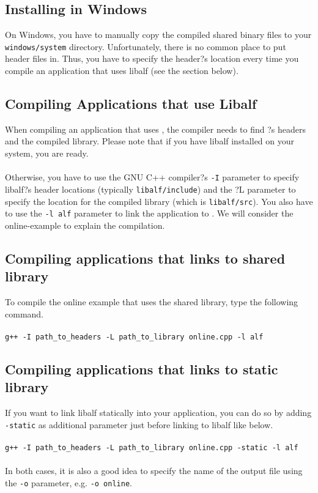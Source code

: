 \subsection*{Installing in Windows}
On Windows, you have to manually copy the compiled shared binary files to your \texttt{windows/system} directory. Unfortunately, there is no common place to put header files in. Thus, you have to specify the header?s location every time you compile an application that uses libalf (see the section below).

\subsection{Compiling Applications that use Libalf}
When compiling an application that uses \libalf, the compiler needs to find \libalf?s headers and the compiled library. Please note that if you have libalf installed on your system, you are ready. 
\paragraph{}
Otherwise, you have to use the GNU C++ compiler?s \texttt{-I} parameter to specify libalf?s header locations (typically \texttt{libalf/include}) and the ?L parameter to specify the location for the compiled library (which is \texttt{libalf/src}). You also have to use the \texttt{-l alf} parameter to link the application to \libalf.
We will consider the online-example to explain the compilation.
\subsection*{Compiling applications that links to shared library}
To compile the online example that uses the shared library, type the following command.
\\ \\
\texttt{g++ -I path\_to\_headers -L path\_to\_library online.cpp -l alf}
\subsection*{Compiling applications that links to static library}
If you want to link libalf statically into your application, you can do so by adding \texttt{-static} as additional parameter just before linking to libalf like below.
\\ \\
\texttt{g++ -I path\_to\_headers -L path\_to\_library online.cpp -static -l alf}
\paragraph{}
In both cases, it is also a good idea to specify the name of the output file using the \texttt{-o} parameter, e.g. \texttt{-o online}.

